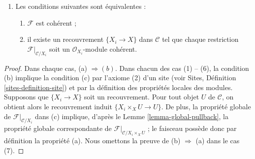 \begin{lemma}
\begin{enumerate}
\begin{enumerate}
$\mathcal{O}_{X_i}$-module de présentation finie ;
\item il existe un recouvrement $\{X_i \to X\}$ dans $\mathcal{C}$ tel que
chaque restriction $\mathcal{F}|_{\mathcal{C}/X_i}$ soit un
$\mathcal{O}_{X_i}$-module admettant une présentation globale finie.
\end{enumerate}
\item Les conditions suivantes sont équivalentes :
\begin{enumerate}
\item $\mathcal{F}$ est cohérent ;
\item il existe un recouvrement $\{X_i \to X\}$ dans $\mathcal{C}$ tel que
chaque restriction $\mathcal{F}|_{\mathcal{C}/X_i}$ soit un
$\mathcal{O}_{X_i}$-module cohérent.
\end{enumerate}
\end{enumerate}
\end{lemma}

\begin{proof}
Dans chaque cas, (a) $\Rightarrow (b)$. Dans chacun des cas (1) -- (6),
la condition (b) implique la condition (c) par l'axiome (2) d'un site
(voir Sites, Définition \ref{sites-definition-site}) et par la définition
des propriétés locales des modules.
Supposons que $\{X_i \to X\}$ soit un recouvrement.
Pour tout objet $U$ de $\mathcal{C}$, on obtient alors le recouvrement induit
$\{X_i \times_X U \to U\}$. De plus, la propriété globale de
$\mathcal{F}|_{\mathcal{C}/X_i}$ dans (c) implique, d'après le
Lemme \ref{lemma-global-pullback}, la propriété globale correspondante de
$\mathcal{F}|_{\mathcal{C}/X_i \times_X U}$ ; le faisceau possède donc par
définition la propriété (a). Nous omettons la preuve de
(b) $\Rightarrow$ (a) dans le cas (7).
\end{proof}

